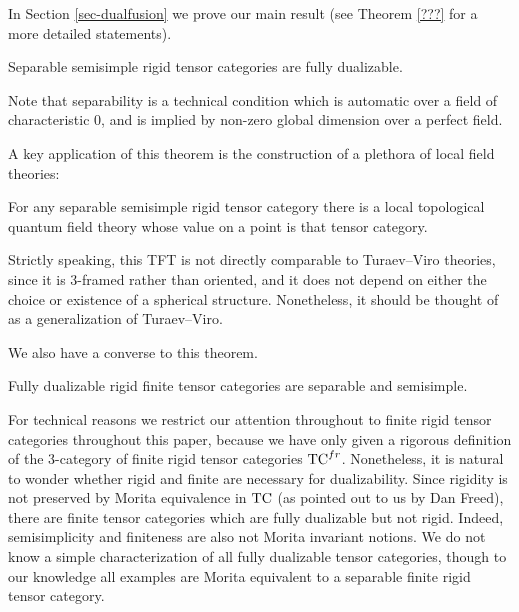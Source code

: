 \documentclass{amsart}
\begin{document}
In Section \ref{sec-dualfusion} we prove our main result (see Theorem \ref{???} for a more detailed statements).

\begin{theorem}
Separable semisimple rigid tensor categories are fully dualizable.
\end{theorem}

\nid Note that separability is a technical condition which is automatic over a field of characteristic $0$, and is implied by non-zero global dimension over a perfect field.


A key application of this theorem is the construction of a plethora of local field theories:
\begin{corollary}
For any separable semisimple rigid tensor category there is a local topological quantum field theory whose value on a point is that tensor category.
\end{corollary}

\nid Strictly speaking, this TFT is not directly comparable to Turaev--Viro theories, since it is $3$-framed rather than oriented, and it does not depend on either the choice or existence of a spherical structure.  Nonetheless, it should be thought of as a generalization of Turaev--Viro.

We also have a converse to this theorem.

\begin{theorem}
Fully dualizable rigid finite tensor categories are separable and semisimple.
\end{theorem}

For technical reasons we restrict our attention throughout to finite rigid tensor categories throughout this paper, because we have only given a rigorous definition of the $3$-category of finite rigid tensor categories $\mathrm{TC}^{fr}$.  Nonetheless, it is natural to wonder whether rigid and finite are necessary for dualizability.  Since rigidity is not preserved by Morita equivalence in $\mathrm{TC}$ (as pointed out to us by Dan Freed), there are finite tensor categories which are fully dualizable but not rigid.  Indeed, semisimplicity and finiteness are also not Morita invariant notions.  We do not know a simple characterization of all fully dualizable tensor categories, though to our knowledge all examples are Morita equivalent to a separable finite rigid tensor category.
\end{document}
